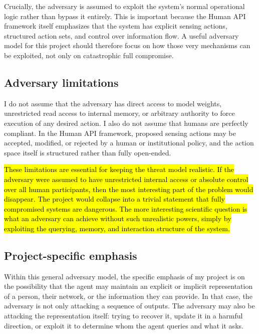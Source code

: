 \documentclass[11pt]{article}
\begin{document}
Crucially, the adversary is assumed to exploit the system's normal operational logic rather than bypass it entirely. This is important because the Human API framework itself emphasizes that the system has explicit sensing actions, structured action sets, and control over information flow. A useful adversary model for this project should therefore focus on how those very mechanisms can be exploited, not only on catastrophic full compromise. \citep{oliver2026humanapi}

\subsection{Adversary limitations}

I do not assume that the adversary has direct access to model weights, unrestricted read access to internal memory, or arbitrary authority to force execution of any desired action. I also do not assume that humans are perfectly compliant. In the Human API framework, proposed sensing actions may be accepted, modified, or rejected by a human or institutional policy, and the action space itself is structured rather than fully open-ended. \citep{oliver2026humanapi}

\hl{These limitations are essential for keeping the threat model realistic. If the adversary were assumed to have unrestricted internal access or absolute control over all human participants, then the most interesting part of the problem would disappear. The project would collapse into a trivial statement that fully compromised systems are dangerous. The more interesting scientific question is what an adversary can achieve without such unrealistic powers, simply by exploiting the querying, memory, and interaction structure of the system.}


\subsection{Project-specific emphasis}

Within this general adversary model, the specific emphasis of my project is on the possibility that the agent may maintain an explicit or implicit representation of a person, their network, or the information they can provide. In that case, the adversary is not only attacking a sequence of outputs. The adversary may also be attacking the representation itself: trying to recover it, update it in a harmful direction, or exploit it to determine whom the agent queries and what it asks.
\end{document}
